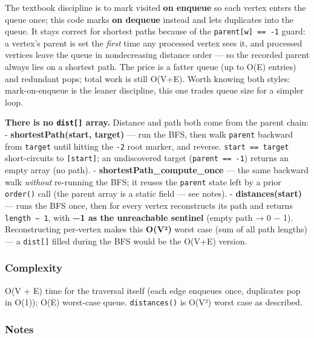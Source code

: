 \documentclass[
  10pt,
  letterpaper,
  onecolumn]{article}
\begin{document}
The textbook discipline is to mark visited \textbf{on enqueue} so each
vertex enters the queue once; this code marks \textbf{on dequeue}
instead and lets duplicates into the queue. It stays correct for
shortest paths because of the \texttt{parent{[}w{]}\ ==\ -1} guard: a
vertex's parent is set the \emph{first} time any processed vertex sees
it, and processed vertices leave the queue in nondecreasing distance
order --- so the recorded parent always lies on a shortest path. The
price is a fatter queue (up to O(E) entries) and redundant pops; total
work is still O(V+E). Worth knowing both styles: mark-on-enqueue is the
leaner discipline, this one trades queue size for a simpler loop.

\textbf{There is no \texttt{dist{[}{]}} array.} Distance and path both
come from the parent chain: - \textbf{shortestPath(start, target)} ---
run the BFS, then walk \texttt{parent} backward from \texttt{target}
until hitting the \texttt{-2} root marker, and reverse.
\texttt{start\ ==\ target} short-circuits to \texttt{{[}start{]}}; an
undiscovered target (\texttt{parent\ ==\ -1}) returns an empty array (no
path). - \textbf{shortestPath\_compute\_once} --- the same backward walk
\emph{without} re-running the BFS; it reuses the \texttt{parent} state
left by a prior \texttt{order()} call (the parent array is a static
field --- see notes). - \textbf{distances(start)} --- runs the BFS once,
then for every vertex reconstructs its path and returns
\texttt{length\ −\ 1}, with \textbf{−1 as the unreachable sentinel}
(empty path → 0 − 1). Reconstructing per-vertex makes this
\textbf{O(V²)} worst case (sum of all path lengths) --- a
\texttt{dist{[}{]}} filled during the BFS would be the O(V+E) version.

\hypertarget{complexity-8}{%
\subsubsection{Complexity}\label{complexity-8}}

O(V + E) time for the traversal itself (each edge enqueues once,
duplicates pop in O(1)); O(E) worst-case queue. \texttt{distances()} is
O(V²) worst case as described.

\hypertarget{notes-7}{%
\subsubsection{Notes}\label{notes-7}}
\end{document}
